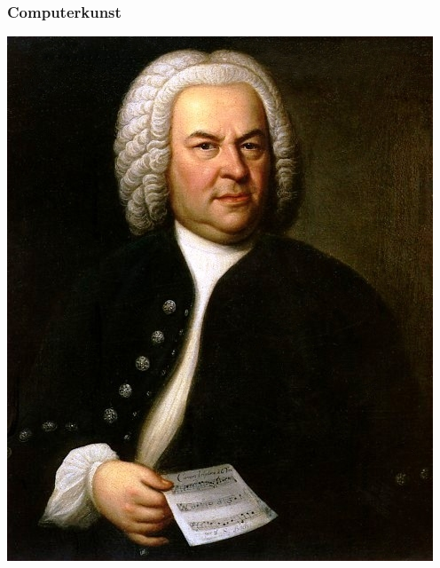 \documentclass[aspectratio=43,x11names]{beamer}
\begin{document}

\begin{frame}[fragile]
\frametitle{Computerkunst}

\begin{minipage}{0.45\textwidth}
\begin{center}
\includegraphics[width=\textwidth, keepaspectratio]{images/bach} 
\end{center}
\end{minipage}
\begin{minipage}{0.45\textwidth}
\begin{center}

\end{center}
\end{minipage}
\end{frame}
\end{document}

